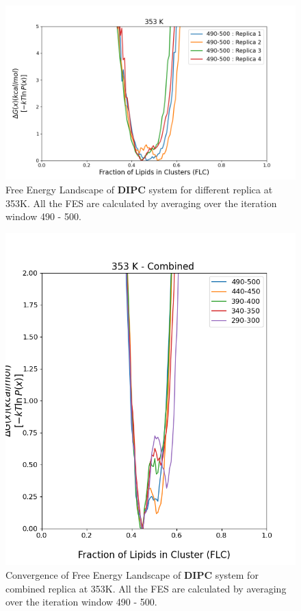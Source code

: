 \documentclass{biophys-new}
\begin{document}

\begin{figure}[hbt!]
\centering
\includegraphics[width=1.1\linewidth]{all_plots/ClusterLipids2Total/DPPC_DIPC_CHOL/353K/Average_DIPC_353_ClusterLipids2Total.png}
\caption{Free Energy Landscape of \textbf{DIPC} system for different replica at 353K. All the FES are calculated by averaging over the iteration window 490 - 500.}
\label{fig:view}

\end{figure}

\begin{figure}[hbt!]
\centering
\includegraphics[width=0.6\linewidth]{all_plots/ClusterLipids2Total/DPPC_DIPC_CHOL/353K/Convergence_DIPC_MULTI__353_ClusterLipids2Total.png}
\caption{Convergence of Free Energy Landscape of \textbf{DIPC} system for combined replica at 353K. All the FES are calculated by averaging over the iteration window 490 - 500.}
\label{fig:view}

\end{figure}
\end{document}
